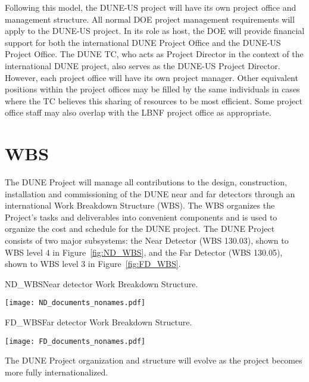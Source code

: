 Following this model, the DUNE-US project will have its own project
office and management structure.  All normal DOE project management
requirements will apply to the DUNE-US project.  In its role as host,
the DOE will provide financial support for both the international DUNE
Project Office and the DUNE-US Project Office. The DUNE TC, who acts
as Project Director in the context of the international DUNE project,
also serves as the DUNE-US Project Director.  However, each project
office will have its own project manager.  Other equivalent positions
within the project offices may be filled by the same individuals in
cases where the TC believes this sharing of resources to be most
efficient. Some project office staff may also overlap with the LBNF
project office as appropriate.

\section[Work Breakdown Structure (WBS)]{WBS}

The DUNE Project will manage all contributions to the design,
construction, installation and commissioning of the DUNE near and far
detectors through an international Work Breakdown Structure (WBS).
The WBS organizes the Project's tasks and deliverables into convenient
components and is used to organize the cost and schedule for the DUNE
project. The DUNE Project consists of two major subsystems: the Near Detector
(WBS 130.03), shown to WBS level 4 in Figure~\ref{fig:ND_WBS}, and the
Far Detector (WBS 130.05), shown to WBS level 3 in
Figure~\ref{fig:FD_WBS}.
\begin{cdrfigure}{ND_WBS}{Near detector Work Breakdown Structure.}
\centering
\begin{center}
\texttt{[image: ND\_documents\_nonames.pdf]}
\end{center}
\end{cdrfigure}
\begin{cdrfigure}{FD_WBS}{Far detector Work Breakdown Structure.}
\centering
\begin{center}
\texttt{[image: FD\_documents\_nonames.pdf]}
\end{center}
\end{cdrfigure}
The DUNE Project organization and structure will evolve as the project
becomes more fully internationalized.
